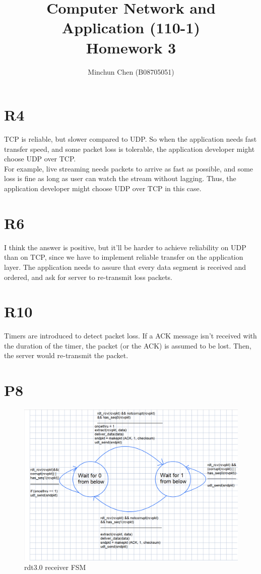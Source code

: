 \documentclass[11pt,a4paper]{article}
\title{Computer Network and Application (110-1) \\ Homework 3}
\author{Minchun Chen (B08705051)}
\date{}
\begin{document}
\maketitle

\section{R4}
TCP is reliable, but slower compared to UDP. So when the application needs fast transfer speed, and some packet loss 
is tolerable, the application developer might choose UDP over TCP.\\
For example, live streaming needs packets to arrive as fast as possible, and some loss is fine as long as user can
watch the stream without lagging. Thus, the application developer might choose UDP over TCP in this case.

\section{R6}
I think the answer is positive, but it'll be harder to achieve reliability on UDP than on TCP, since we have to 
implement reliable transfer on the application layer. The application needs to assure that every data segment is 
received and ordered, and ask for server to re-transmit loss packets.

\section{R10}
Timers are introduced to detect packet loss. If a ACK message isn't received with the duration of the timer, the packet 
(or the ACK) is assumed to be lost. Then, the server would re-transmit the packet.

\section{P8}
\begin{figure}[H]
    \includegraphics[width=\linewidth]{./rdt_receiver.png}
    \caption{rdt3.0 receiver FSM}
    \label{rdt_receiver}
\end{figure}
\end{document}
